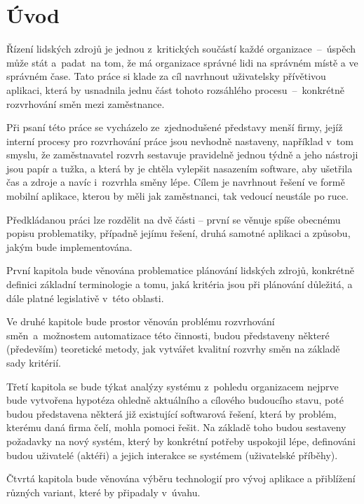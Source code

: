\documentclass[twoside]{ctuthesis}
\begin{document}
\maketitle

%
\chapter*{Úvod}

Řízení lidských zdrojů je jednou z~kritických součástí každé organizace~–~úspěch může stát a~padat~na tom, že má organizace správné lidi na správném místě a ve správném čase. Tato práce si klade za cíl navrhnout uživatelsky přívětivou aplikaci, která by usnadnila jednu část tohoto rozsáhlého procesu~–~konkrétně rozvrhování směn mezi zaměstnance.

Při psaní této práce se vycházelo ze~zjednodušené představy menší firmy, jejíž interní procesy pro rozvrhování práce jsou nevhodně nastaveny, například v~tom smyslu, že zaměstnavatel rozvrh sestavuje pravidelně jednou týdně a jeho nástroji jsou papír a tužka, a která by je chtěla vylepšit nasazením software, aby ušetřila čas a zdroje a navíc i~rozvrhla směny lépe. Cílem je navrhnout řešení ve formě mobilní aplikace, kterou by měli jak zaměstnanci, tak vedoucí neustále po ruce.

Předkládanou práci lze rozdělit na dvě části – první se věnuje spíše obecnému popisu problematiky, případně jejímu řešení, druhá samotné aplikaci a způsobu, jakým bude implementována.

První kapitola bude věnována problematice plánování lidských zdrojů, konkrétně definici základní terminologie a tomu, jaká kritéria jsou při plánování důležitá, a dále platné legislativě v~této oblasti.

Ve druhé kapitole bude prostor věnován problému rozvrhování směn~a~možnostem automatizace této činnosti, budou představeny některé (především) teoretické metody, jak vytvářet kvalitní rozvrhy směn na základě sady kritérií.

Třetí kapitola se bude týkat analýzy systému z~pohledu organizacem nejprve bude vytvořena hypotéza ohledně aktuálního a cílového budoucího stavu, poté budou představena některá již existující softwarová řešení, která by problém, kterému daná firma čelí, mohla pomoci řešit. Na základě toho budou sestaveny požadavky na nový systém, který by konkrétní potřeby uspokojil lépe, definováni budou uživatelé (aktéři) a jejich interakce se systémem (uživatelské příběhy).

Čtvrtá kapitola bude věnována výběru technologií pro vývoj aplikace a přiblížení různých variant, které by připadaly v~úvahu.
\end{document}
